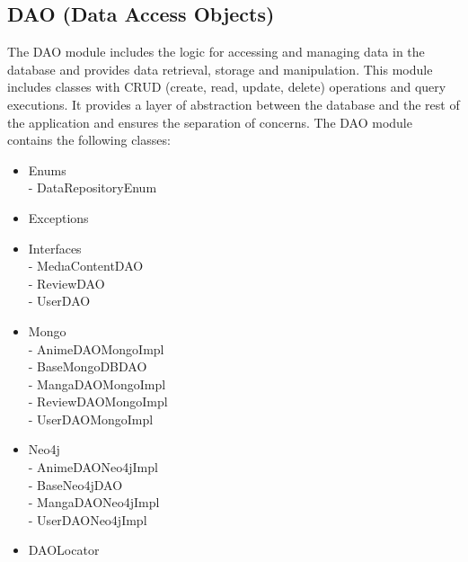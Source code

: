 \subsection*{DAO (Data Access Objects)}

The DAO module includes the logic for accessing and managing data in the database and provides data retrieval, 
storage and manipulation. This module includes classes with CRUD (create, read, update, delete) operations and query executions. 
It provides a layer of abstraction between the database and the rest of the application and ensures the separation of concerns. The DAO module contains the following classes:
\begin{itemize}
    \item Enums \\
    - DataRepositoryEnum
    \item Exceptions 
    \item Interfaces \\
    - MedıaContentDAO \\
    - ReviewDAO \\
    - UserDAO 
    \item Mongo \\
    - AnimeDAOMongoImpl \\
    - BaseMongoDBDAO \\
    - MangaDAOMongoImpl \\
    - ReviewDAOMongoImpl \\
    - UserDAOMongoImpl 
    \item Neo4j \\
    - AnimeDAONeo4jImpl \\
    - BaseNeo4jDAO \\
    - MangaDAONeo4jImpl \\
    - UserDAONeo4jImpl 
    \item DAOLocator 
\end{itemize}

\newpage

